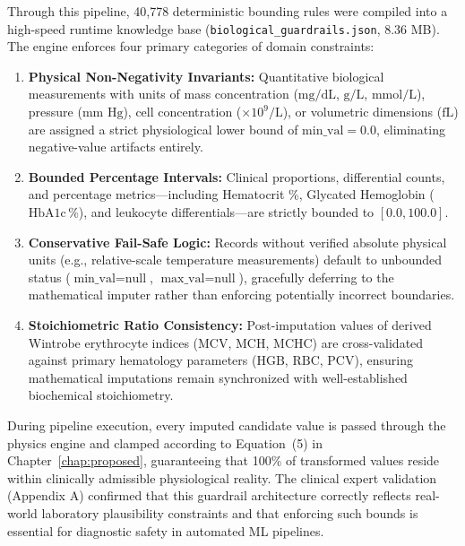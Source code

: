 \documentclass[MTech]{ugthesis}
\begin{document}
Through this pipeline, 40,778 deterministic bounding rules were compiled into a high-speed runtime knowledge base (\texttt{biological\_guardrails.json}, 8.36 MB). The engine enforces four primary categories of domain constraints:
\begin{enumerate}
    \item \textbf{Physical Non-Negativity Invariants:} Quantitative biological measurements with units of mass concentration ($\text{mg/dL}$, $\text{g/L}$, $\text{mmol/L}$), pressure ($\text{mm Hg}$), cell concentration ($\times 10^9/\text{L}$), or volumetric dimensions ($\text{fL}$) are assigned a strict physiological lower bound of $\text{min\_val} = 0.0$, eliminating negative-value artifacts entirely.
    \item \textbf{Bounded Percentage Intervals:} Clinical proportions, differential counts, and percentage metrics---including Hematocrit \%, Glycated Hemoglobin ($\text{HbA1c}\,\%$), and leukocyte differentials---are strictly bounded to $[0.0, 100.0]$.
    \item \textbf{Conservative Fail-Safe Logic:} Records without verified absolute physical units (e.g., relative-scale temperature measurements) default to unbounded status ($\text{min\_val} = \text{null}$, $\text{max\_val} = \text{null}$), gracefully deferring to the mathematical imputer rather than enforcing potentially incorrect boundaries.
    \item \textbf{Stoichiometric Ratio Consistency:} Post-imputation values of derived Wintrobe erythrocyte indices ($\text{MCV}$, $\text{MCH}$, $\text{MCHC}$) are cross-validated against primary hematology parameters ($\text{HGB}$, $\text{RBC}$, $\text{PCV}$), ensuring mathematical imputations remain synchronized with well-established biochemical stoichiometry.
\end{enumerate}

During pipeline execution, every imputed candidate value is passed through the physics engine and clamped according to Equation~(5) in Chapter~\ref{chap:proposed}, guaranteeing that 100\% of transformed values reside within clinically admissible physiological reality. The clinical expert validation (Appendix A) confirmed that this guardrail architecture correctly reflects real-world laboratory plausibility constraints and that enforcing such bounds is essential for diagnostic safety in automated ML pipelines.
\end{document}

